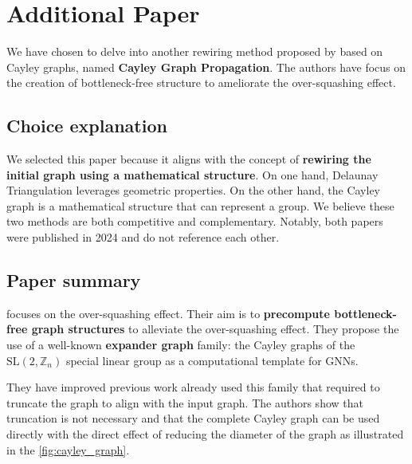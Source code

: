 \documentclass{article}
\theoremstyle{plain}
\theoremstyle{definition}
\theoremstyle{remark}
\begin{document}
\section{Additional Paper}
We have chosen to delve into another rewiring method proposed by \cite{wilson2024cayleygraphpropagation}
based on Cayley graphs, named \textbf{Cayley Graph Propagation}. 
The authors have focus on the creation of bottleneck-free
structure to ameliorate the over-squashing effect. 

\subsection{Choice explanation}
We selected this paper because it aligns with the concept of \textbf{rewiring
the initial graph using a mathematical structure}.
On one hand, Delaunay Triangulation leverages geometric properties. 
On the other hand, the Cayley graph is a mathematical structure that can represent a group.
We believe these two methods are both competitive and complementary.
Notably, both papers were published in 2024 and do not reference each other.

\subsection{Paper summary}
\cite{wilson2024cayleygraphpropagation} focuses on the over-squashing effect.
Their aim is to \textbf{precompute bottleneck-free graph structures} to alleviate the
over-squashing effect. They propose the use of a well-known \textbf{expander graph} family:
the Cayley graphs of the $\text{SL}(2,\mathbb{Z}_n)$ special linear group as a computational template for GNNs.

They have improved previous work already used this family that required to 
truncate the graph to align with the input graph. The authors show that truncation is
not necessary and that the complete Cayley graph can be used directly with 
the direct effect of reducing the diameter of the graph as illustrated in the \cref{fig:cayley_graph}.
\end{document}
